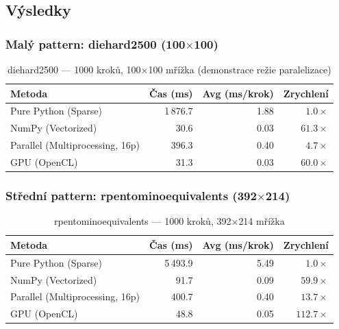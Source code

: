 \documentclass[12pt,a4paper]{article}
\begin{document}
\subsection{Výsledky}

\subsubsection{Malý pattern: diehard2500 (100$\times$100)}

\begin{table}[H]
\centering
\begin{tabular}{@{}lrrr@{}}
\toprule
\textbf{Metoda} & \textbf{Čas (ms)} & \textbf{Avg (ms/krok)} & \textbf{Zrychlení} \\
\midrule
Pure Python (Sparse)            & 1\,876.7 & 1.88 & $1.0\times$ \\
NumPy (Vectorized)              &    30.6  & 0.03 & $61.3\times$ \\
Parallel (Multiprocessing, 16p) &   396.3  & 0.40 & $4.7\times$ \\
GPU (OpenCL)                    &    31.3  & 0.03 & $60.0\times$ \\
\bottomrule
\end{tabular}
\caption{diehard2500 --- 1000 kroků, 100$\times$100 mřížka (demonstrace režie paralelizace)}
\end{table}

\subsubsection{Střední pattern: rpentominoequivalents (392$\times$214)}

\begin{table}[H]
\centering
\begin{tabular}{@{}lrrr@{}}
\toprule
\textbf{Metoda} & \textbf{Čas (ms)} & \textbf{Avg (ms/krok)} & \textbf{Zrychlení} \\
\midrule
Pure Python (Sparse)            & 5\,493.9 & 5.49 & $1.0\times$ \\
NumPy (Vectorized)              &    91.7  & 0.09 & $59.9\times$ \\
Parallel (Multiprocessing, 16p) &   400.7  & 0.40 & $13.7\times$ \\
GPU (OpenCL)                    &    48.8  & 0.05 & $112.7\times$ \\
\bottomrule
\end{tabular}
\caption{rpentominoequivalents --- 1000 kroků, 392$\times$214 mřížka}
\end{table}
\end{document}
